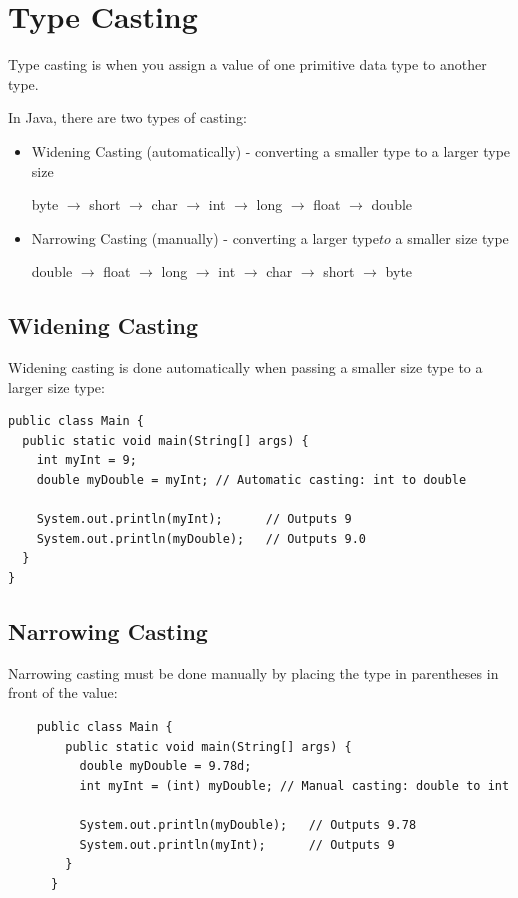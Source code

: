 \section{Type Casting}

Type casting is when you assign a value of one primitive data type to another type.

In Java, there are two types of casting:

\begin{itemize}
    \item Widening Casting (automatically) - converting a smaller type to a larger type size
    \begin{center}
    byte $\to$ short $\to$ char $\to$ int $\to$ long $\to$ float $\to$ double
    \end{center}
    \item Narrowing Casting (manually) - converting a larger type$ to$ a smaller size type
    \begin{center}
        double $\to$ float $\to$ long $\to$ int $\to$ char $\to$ short $\to$ byte 
    \end{center}
\end{itemize}

\subsection{Widening Casting}
Widening casting is done automatically when passing a smaller size type to a larger size type:

\begin{verbatim}
public class Main {
  public static void main(String[] args) {
    int myInt = 9;
    double myDouble = myInt; // Automatic casting: int to double

    System.out.println(myInt);      // Outputs 9
    System.out.println(myDouble);   // Outputs 9.0
  }
}
\end{verbatim}

\subsection{Narrowing Casting}

Narrowing casting must be done manually by placing the type in parentheses in front of the value: 

\begin{verbatim}
    public class Main {
        public static void main(String[] args) {
          double myDouble = 9.78d;
          int myInt = (int) myDouble; // Manual casting: double to int
      
          System.out.println(myDouble);   // Outputs 9.78
          System.out.println(myInt);      // Outputs 9
        }
      }      
\end{verbatim}

